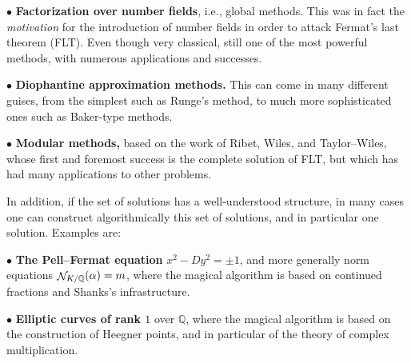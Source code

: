 \documentclass[10pt,a4]{seminar}
\newcommand{\Q}{{\mathbb{Q}}}
\DeclareMathOperator{\N}{{\cal N}}
\newcommand{\al}{\alpha}
\newcommand{\ctl}{\centerline}
\newcommand{\myblue}{\red}
\begin{document}
\begin{slide}
\ctl{\large{}\myblue{\sc Tools (II)}}

\medskip

{\red $\bullet$} {\bf Factorization over number fields}, i.e., global methods.
This was in fact the \emph{motivation} for the introduction of number fields 
in order to attack {\red Fermat's last theorem (FLT)}. Even though very 
classical, still one of the most powerful methods, with numerous applications 
and successes.

\smallskip

{\red $\bullet$} {\bf Diophantine approximation methods.} This can come in
many different guises, from the simplest such as {\red Runge's method},
to much more sophisticated ones such as {\red Baker-type methods}.

\smallskip

{\red $\bullet$} {\bf Modular methods,} based on the work of {\red Ribet},
{\red Wiles}, and {\red Taylor--Wiles}, whose first and foremost success is
the complete solution of FLT, but which has had many applications to other
problems.

\end{slide}

\begin{slide}
\ctl{\large{}\myblue{\sc Tools (III)}}

\medskip

In addition, if the set of solutions has a well-understood {\red structure}, 
in many cases one can {\red construct algorithmically} this set of solutions,
and in particular {\red one} solution. Examples are:

{\red $\bullet$} {\bf The Pell--Fermat equation} {\blue $x^2-Dy^2=\pm1$}, and
more generally {\red norm equations} {\blue $\N_{K/\Q}(\al)=m$}, where the
magical algorithm is based on {\red continued fractions} and {\red Shanks's
infrastructure}.

{\red $\bullet$} {\bf Elliptic curves of rank $1$} over {\blue $\Q$}, where
the magical algorithm is based on the construction of {\red Heegner points},
and in particular of the theory of {\red complex multiplication}.

\end{slide}
\end{document}
